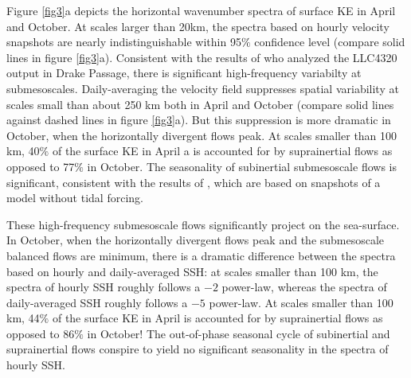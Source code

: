 \documentclass[grl]{agutex2015}
\begin{document}
\begin{article}
Figure \ref{fig3}a depicts the horizontal wavenumber spectra of surface KE in
April and October. At scales larger than 20km, the spectra based on hourly
velocity snapshots are nearly indistinguishable within 95$\%$ confidence level
(compare solid lines in figure \ref{fig3}a). Consistent with the results of
\citet{rocha_etal2016} who analyzed the LLC4320 output in Drake Passage,
there is significant high-frequency variabilty at submesoscales. Daily-averaging
the velocity field suppresses spatial variability at scales small than about 250
km both in April and October (compare solid lines against dashed lines in figure
\ref{fig3}a). But this suppression is more dramatic in October, when the horizontally
divergent flows peak. At scales
smaller than 100 km, 40$\%$ of the surface KE in April a is accounted for by suprainertial
flows as opposed to 77$\%$ in October. The seasonality of subinertial submesoscale flows
is significant, consistent with the results of \citet{sasaki_etal2014}, which are
based on snapshots of a model without tidal forcing.

These high-frequency submesoscale flows significantly project on the sea-surface.
In October, when the horizontally divergent flows peak and the submesoscale
balanced flows are minimum, there is a dramatic difference between the spectra
based on hourly and daily-averaged SSH: at scales smaller than 100 km, the spectra
of hourly SSH roughly follows a $-2$ power-law, whereas the spectra of daily-averaged
SSH roughly follows a $-5$ power-law. At scales
smaller than 100 km, 44$\%$ of the surface KE in April is accounted for by suprainertial
flows as opposed to 86$\%$ in October! The out-of-phase seasonal cycle of subinertial
and suprainertial flows conspire to yield no significant seasonality in the spectra
of hourly SSH.

%
%
%





\end{article}
\end{document}
